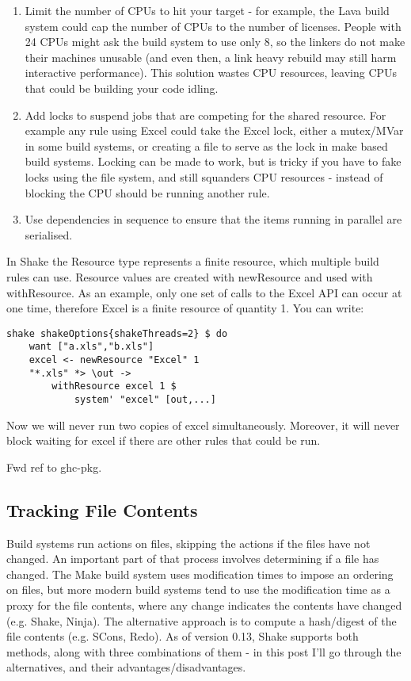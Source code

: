 \begin{enumerate}
\item Limit the number of CPUs to hit your target - for example, the Lava build system could cap the number of CPUs to the number of licenses. People with 24 CPUs might ask the build system to use only 8, so the linkers do not make their machines unusable (and even then, a link heavy rebuild may still harm interactive performance). This solution wastes CPU resources, leaving CPUs that could be building your code idling.
\item Add locks to suspend jobs that are competing for the shared resource. For example any rule using Excel could take the Excel lock, either a mutex/MVar in some build systems, or creating a file to serve as the lock in make based build systems. Locking can be made to work, but is tricky if you have to fake locks using the file system, and still squanders CPU resources - instead of blocking the CPU should be running another rule.
\item Use dependencies in sequence to ensure that the items running in parallel are serialised.
\end{enumerate}

In Shake the Resource type represents a finite resource, which multiple build rules can use. Resource values are created with newResource and used with withResource. As an example, only one set of calls to the Excel API can occur at one time, therefore Excel is a finite resource of quantity 1. You can write:

\begin{lstlisting}
shake shakeOptions{shakeThreads=2} $ do
    want ["a.xls","b.xls"]
    excel <- newResource "Excel" 1
    "*.xls" *> \out ->
        withResource excel 1 $
            system' "excel" [out,...]
\end{lstlisting}

Now we will never run two copies of excel simultaneously. Moreover, it will never block waiting for excel if there are other rules that could be run.

Fwd ref to ghc-pkg.

\subsection{Tracking File Contents\label{sec:file-contents}}

Build systems run actions on files, skipping the actions if the files have not changed. An important part of that process involves determining if a file has changed. The Make build system uses modification times to impose an ordering on files, but more modern build systems tend to use the modification time as a proxy for the file contents, where any change indicates the contents have changed (e.g. Shake, Ninja). The alternative approach is to compute a hash/digest of the file contents (e.g. SCons, Redo). As of version 0.13, Shake supports both methods, along with three combinations of them - in this post I'll go through the alternatives, and their advantages/disadvantages.

